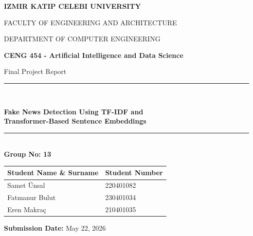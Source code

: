 \documentclass[11pt]{article}
\begin{document}
\begin{titlepage}
    \centering
    \vspace*{1cm}

    {\Large \bfseries IZMIR KATIP CELEBI UNIVERSITY \par}
    \vspace{0.3cm}
    {\large FACULTY OF ENGINEERING AND ARCHITECTURE \par}
    \vspace{0.3cm}
    {\large DEPARTMENT OF COMPUTER ENGINEERING \par}

    \vspace{2.5cm}

    {\large \bfseries CENG 454 - Artificial Intelligence and Data Science \par}
    \vspace{0.2cm}
    {\large Final Project Report \par}

    \vspace{1.5cm}

    \rule{\linewidth}{0.5mm} \\[0.4cm]
    {\LARGE \bfseries Fake News Detection Using TF-IDF and \\[0.3cm] Transformer-Based Sentence Embeddings \par}
    \rule{\linewidth}{0.5mm} \\[1.5cm]

    \large \textbf{Group No: 13} \\[1cm]

    \begin{table}[H]
        \centering
        \large
        \begin{tabular}{ll}
            \textbf{Student Name \& Surname} & \textbf{Student Number} \\ \midrule
            Samet Ünsal & 220401082 \\
            Fatmanur Bulut & 230401034 \\
            Eren Makraç & 210401035 \\
        \end{tabular}
    \end{table}

    \vfill

    {\large \textbf{Submission Date:} May 22, 2026 \par}
    \vspace*{1cm}
\end{titlepage}
\end{document}
